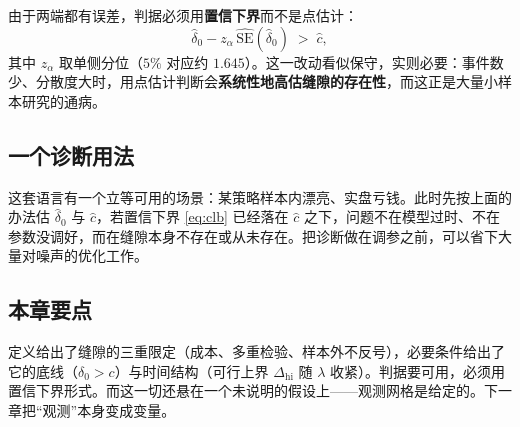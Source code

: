 由于两端都有误差，判据必须用\textbf{置信下界}而不是点估计：
\begin{equation}
  \hat\delta_0 - z_{\alpha}\,\widehat{\mathrm{SE}}(\hat\delta_0) \;>\; \hat c ,
  \label{eq:clb}
\end{equation}
其中 $z_\alpha$ 取单侧分位（$5\%$ 对应约 $1.645$）。这一改动看似保守，实则必要：事件数少、分散度大时，用点估计判断会\textbf{系统性地高估缝隙的存在性}，而这正是大量小样本研究的通病。

\subsection{一个诊断用法}

这套语言有一个立等可用的场景：某策略样本内漂亮、实盘亏钱。此时先按上面的办法估 $\hat\delta_0$ 与 $\hat c$，若置信下界 \eqref{eq:clb} 已经落在 $\hat c$ 之下，问题不在模型过时、不在参数没调好，而在缝隙本身不存在或从未存在。把诊断做在调参之前，可以省下大量对噪声的优化工作。

\subsection{本章要点}

定义给出了缝隙的三重限定（成本、多重检验、样本外不反号），必要条件给出了它的底线（$\delta_0>c$）与时间结构（可行上界 $\Delta_{\mathrm{hi}}$ 随 $\lambda$ 收紧）。判据要可用，必须用置信下界形式。而这一切还悬在一个未说明的假设上——观测网格是给定的。下一章把“观测”本身变成变量。